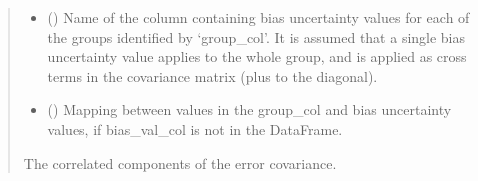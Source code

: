 \documentclass[letterpaper,10pt,english]{sphinxmanual}
\begin{document}
\begin{fulllineitems}
\begin{quote}
\begin{description}
\begin{itemize}
\item {}
\sphinxAtStartPar
{} (\sphinxstyleliteralemphasis{\sphinxupquote{ | }}) \textendash{} Name of the column containing bias uncertainty values for each of
the groups identified by ‘group\_col’. It is assumed that a single bias
uncertainty value applies to the whole group, and is applied as cross
terms in the covariance matrix (plus to the diagonal).

\item {}
\sphinxAtStartPar
{} (\sphinxstyleliteralemphasis{\sphinxupquote{{[}}}\sphinxstyleliteralemphasis{\sphinxupquote{, }}\sphinxstyleliteralemphasis{\sphinxupquote{{]} }}\sphinxstyleliteralemphasis{\sphinxupquote{| }}) \textendash{} Mapping between values in the group\_col and bias uncertainty values,
if bias\_val\_col is not in the DataFrame.

\end{itemize}

\sphinxAtStartPar
The correlated components of the error covariance.

\end{description}\end{quote}

\end{fulllineitems}

\end{document}
